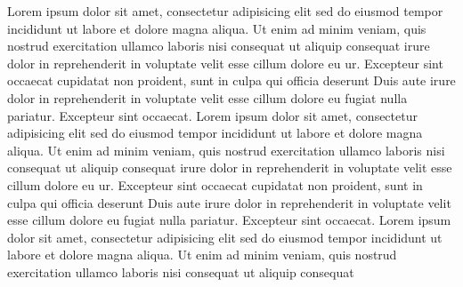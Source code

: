 \documentclass[a4paper, oneside, notitlepage, 12pt]{article}
\begin{document}
\begin{pages}
\begin{Rightside}
\beginnumbering
{}
Lorem ipsum dolor sit amet, consectetur adipisicing elit
sed do eiusmod tempor incididunt ut labore et dolore
magna aliqua. Ut enim ad minim veniam, quis nostrud
exercitation ullamco laboris nisi
 consequat ut aliquip consequat\pend[]
 irure dolor in reprehenderit
in voluptate velit esse cillum dolore eu ur. Excepteur sint occaecat
cupidatat non proident, sunt in culpa qui officia deserunt
Duis aute irure dolor in reprehenderit
in voluptate velit esse cillum dolore eu fugiat nulla
pariatur. Excepteur sint occaecat.
\pend
{}
Lorem ipsum dolor sit amet, consectetur adipisicing elit
sed do eiusmod tempor incididunt ut labore et dolore
magna aliqua. Ut enim ad minim veniam, quis nostrud
exercitation ullamco laboris nisi
 consequat ut aliquip consequat\pend[]
 irure dolor in reprehenderit
in voluptate velit esse cillum dolore eu ur. Excepteur sint occaecat
cupidatat non proident, sunt in culpa qui officia deserunt
Duis aute irure dolor in reprehenderit
in voluptate velit esse cillum dolore eu fugiat nulla
pariatur. Excepteur sint occaecat.
\pend
{}
Lorem ipsum dolor sit amet, consectetur adipisicing elit
sed do eiusmod tempor incididunt ut labore et dolore
magna aliqua. Ut enim ad minim veniam, quis nostrud
exercitation ullamco laboris nisi
 consequat ut aliquip consequat\pend[]

\end{Rightside}
\end{pages}
\end{document}
